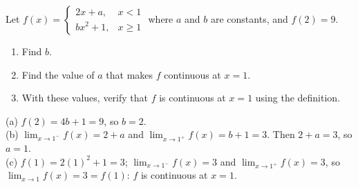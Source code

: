 \begin{exo}{}
Let $f(x)=\begin{cases}2x+a, & x<1\\ bx^2+1, & x\ge1\end{cases}$ where $a$ and $b$ are constants, and $f(2)=9$.
\begin{enumerate}[label=(\alph*)]
\item Find $b$.
\item Find the value of $a$ that makes $f$ continuous at $x=1$.
\item With these values, verify that $f$ is continuous at $x=1$ using the definition.
\end{enumerate}
\begin{solution}
(a) $f(2)=4b+1=9$, so $b=2$.\\
(b) $\lim_{x\to1^-}f(x)=2+a$ and $\lim_{x\to1^+}f(x)=b+1=3$. Then $2+a=3$, so $a=1$.\\
(c) $f(1)=2(1)^2+1=3$; $\lim_{x\to1^-}f(x)=3$ and $\lim_{x\to1^+}f(x)=3$, so $\lim_{x\to1}f(x)=3=f(1)$: $f$ is continuous at $x=1$.
\end{solution}
\end{exo}

